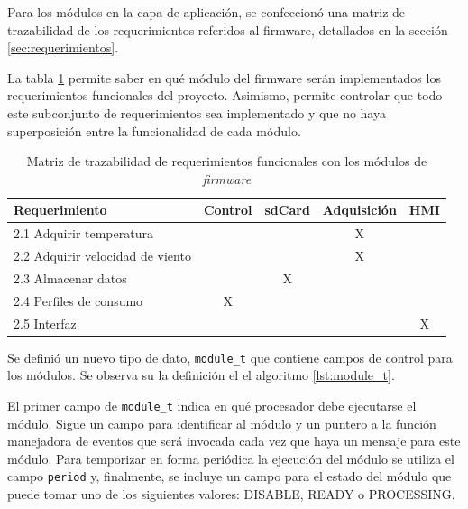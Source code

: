 \vspace{10px}

Para los módulos en la capa de aplicación, se confeccionó una matriz de trazabilidad de los requerimientos referidos al firmware, detallados en la sección \ref{sec:requerimientos}. 

La tabla \ref{tab:trazabilidad} permite saber en qué módulo del firmware serán implementados los requerimientos funcionales del proyecto.  Asimismo, permite controlar que todo este subconjunto de requerimientos sea implementado y que no haya superposición entre la funcionalidad de cada módulo.

\vspace{5px}

\begin{table}[ht]
\centering
\caption[Matriz de trazabilidad de requerimientos funcionales]{Matriz de trazabilidad de requerimientos funcionales con los módulos de \textit{firmware}}
\label{tab:trazabilidad}
\begin{tabular}{lcccc}
\toprule
\textbf{Requerimiento} & \textbf{Control} & \textbf{sdCard} & \textbf{Adquisición} & \textbf{HMI} \\ \midrule
2.1 Adquirir temperatura                   &                  &                 & X                    &              \\ %
2.2 Adquirir velocidad de viento           &                  &                 & X                    &              \\ %
2.3 Almacenar datos                        &                  & X               &                      &              \\ %
2.4 Perfiles de consumo                    & X                &                 &                      &              \\ %
2.5 Interfaz                               &                  &                 &                      & X            \\ \bottomrule
\end{tabular}
\end{table}

Se definió un nuevo tipo de dato, \texttt{module\_t} que contiene campos de control para los módulos. Se observa su la definición el el algoritmo \ref{lst:module_t}.

El primer campo de \texttt{module\_t} indica en qué procesador debe ejecutarse el módulo. Sigue un campo para identificar al módulo y un puntero a la función manejadora de eventos que será invocada cada vez que haya un mensaje para este módulo. Para temporizar en forma periódica la ejecución del módulo se utiliza el campo \texttt{period} y, finalmente, se incluye un campo para el estado del módulo que puede tomar uno de los siguientes valores: DISABLE, READY o PROCESSING.

